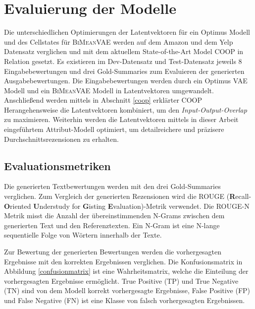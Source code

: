 \section{Evaluierung der Modelle}\raggedbottom
\label{evalmetric}
Die unterschiedlichen Optimierungen der Latentvektoren für ein Optimus Modell und des Cellstates für \textsc{BiMeanVAE} werden auf dem Amazon und dem Yelp Datensatz verglichen und mit dem aktuellem State-of-the-Art Model COOP in Relation gesetzt.
Es existieren im Dev-Datensatz und Test-Datensatz jeweils 8 Eingabebewertungen und drei Gold-Summaries zum Evaluieren der generierten Ausgabebewertungen.
Die Eingabebewertungen werden durch ein Optimus VAE Modell und ein \textsc{BiMeanVAE} Modell in Latentvektoren umgewandelt.
Anschließend werden mittels in Abschnitt \ref{coop} erklärter COOP Herangehensweise die Latentvektoren kombiniert, um den \textit{Input-Output-Overlap} zu maximieren. 
Weiterhin werden die Latentvektoren mittels in dieser Arbeit eingeführtem Attribut-Modell optimiert, um detailreichere und präzisere Durchschnittsrezensionen zu erhalten.


\subsection{Evaluationsmetriken}
Die generierten Textbewertungen werden mit den drei Gold-Summaries verglichen.
Zum Vergleich der generierten Rezensionen wird die ROUGE (\textbf{R}ecall-\textbf{O}riented \textbf{U}nderstudy for \textbf{G}isting \textbf{E}valuation)-Metrik verwendet.
Die ROUGE-N Metrik misst die Anzahl der übereinstimmenden N-Grams zwischen dem generierten Text und den Referenztexten. 
Ein N-Gram ist eine N-lange sequentielle Folge von Wörtern innerhalb der Texte. 

Zur Bewertung der generierten Bewertungen werden die vorhergesagten Ergebnisse mit den korrekten Ergebnissen verglichen. 
Die Konfusionsmatrix in Abbildung \ref{confusionmatrix} ist eine Wahrheitsmatrix, welche die Einteilung der vorhergesagten Ergebnisse ermöglicht. 
True Positive (TP) und True Negative (TN) sind von dem Modell korrekt vorhergesagte Ergebnisse, False Positive (FP) und False Negative (FN) ist eine Klasse von falsch vorhergesagten Ergebnissen.


